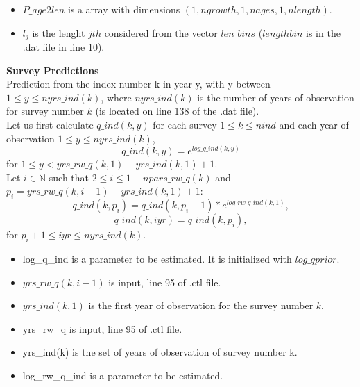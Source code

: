\documentclass{article}
\begin{document}
\begin{itemize}
    \item $P\_age2len$ is a array with dimensions  $(1,ngrowth,1,nages,1,nlength)$.
\end{itemize}
\begin{itemize}
    \item $l_j$ is the lenght $jth$ considered from the vector $len\_bins$ ($lengthbin$ is in the .dat file in
    line 10).
\end{itemize}

\textbf{Survey Predictions}\\

Prediction from the index number k in year y, with y between $1\leq y \leq nyrs\_ind(k)$, where $nyrs\_ind(k)$ is the number of years of observation for survey number $k$ (is located on line 138 of the .dat file).\\
Let us first calculate $q\_ind(k,y)$ for each survey $1\leq k \leq nind$ and each year of observation $1\leq y \leq nyrs\_ind(k)$,
\begin{equation}
    q\_ind(k,y)=e^{log\_q\_ind(k,y)}
\end{equation}
for $1\leq y < yrs\_rw\_q(k,1)-yrs\_ind(k,1)+1$.\\

Let $i\in\mathbb{N}$ such that $2\leq i \leq 1+npars\_rw\_q(k)$ and $p_i=yrs\_rw\_q(k,i-1)-yrs\_ind(k,1)+1$:
\begin{equation}
     q\_ind(k,p_i)  = q\_ind(k,p_i-1)*e^{log\_rw\_q\_ind(k,1)},
\end{equation}
\begin{equation}
    q\_ind(k,iyr)  = q\_ind(k,p_i), 
\end{equation}
for $p_i+1\leq iyr \leq nyrs\_ind(k).$
\begin{itemize}
    \item log\_q\_ind is a parameter to be estimated. It is initialized with $log\_qprior$.
    \item $yrs\_rw\_q(k,i-1)$ is input, line 95 of .ctl file.
    \item $yrs\_ind(k,1)$ is the first year of observation for the survey number $k$.
    \item yrs\_rw\_q is input, line 95 of .ctl file.
    \item yrs\_ind(k) is the set of years of observation of survey number k. 
    \item log\_rw\_q\_ind is a parameter to be estimated.
\end{itemize}
\end{document}
